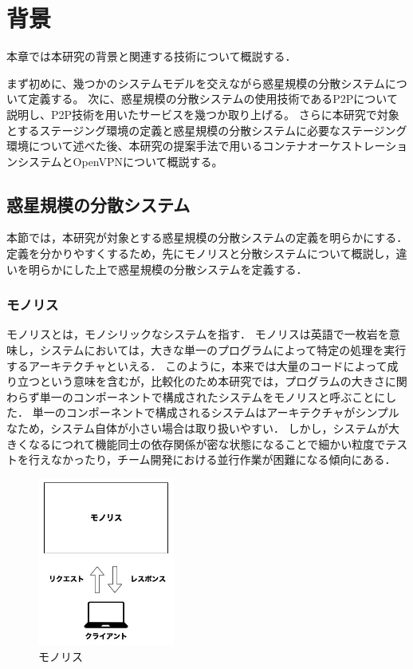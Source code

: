 \chapter{背景}
\label{background}

本章では本研究の背景と関連する技術について概説する．

まず初めに、幾つかのシステムモデルを交えながら惑星規模の分散システムについて定義する。
次に、惑星規模の分散システムの使用技術であるP2Pについて説明し、P2P技術を用いたサービスを幾つか取り上げる。
さらに本研究で対象とするステージング環境の定義と惑星規模の分散システムに必要なステージング環境について述べた後、本研究の提案手法で用いるコンテナオーケストレーションシステムとOpenVPNについて概説する。

\section{惑星規模の分散システム}
\label{bg:definition}

本節では，本研究が対象とする惑星規模の分散システムの定義を明らかにする．
定義を分かりやすくするため，先にモノリスと分散システムについて概説し，違いを明らかにした上で惑星規模の分散システムを定義する．

\subsection{モノリス}
\label{bg:definition:monolith}

モノリスとは，モノシリックなシステムを指す．
モノリスは英語で一枚岩を意味し，システムにおいては，大きな単一のプログラムによって特定の処理を実行するアーキテクチャといえる．
このように，本来では大量のコードによって成り立つという意味を含むが，比較化のため本研究では，プログラムの大きさに関わらず単一のコンポーネントで構成されたシステムをモノリスと呼ぶことにした．
単一のコンポーネントで構成されるシステムはアーキテクチャがシンプルなため，システム自体が小さい場合は取り扱いやすい．
しかし，システムが大きくなるにつれて機能同士の依存関係が密な状態になることで細かい粒度でテストを行えなかったり，チーム開発における並行作業が困難になる傾向にある．

\begin{figure}[htbp]
\begin{center}
    \includegraphics[width=0.4\textwidth]{./figures/monolith.jpg}
    \caption{モノリス}
\end{center}
\end{figure}

